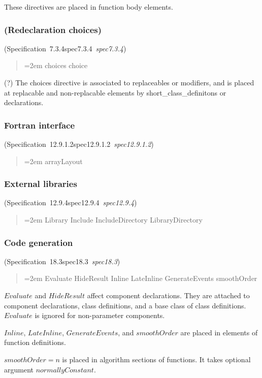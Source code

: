 \documentclass[10pt,b5paper]{article}
\def\specrefx#1#2{Specification~#1\ifx\relax#2\relax{}\else~{\it{}#2}\fi}
\def\specref#1{\specrefx{#1}{\csname spec#1\endcsname}}
\begin{document}
These directives are placed in function body elements.

\subsubsection*{(Redeclaration choices)}
(\specref{7.3.4}\/)

\begin{quote}\spaceskip=2em
choices
choice
\end{quote}

(?) The choices directive is associated to replaceables or modifiers,
and is placed at replacable and non-replacable elements by
short_class_definitons or declarations.

\subsubsection*{Fortran interface}
(\specref{12.9.1.2}\/)

\begin{quote}\spaceskip=2em
arrayLayout
\end{quote}

\subsubsection*{External libraries}
(\specref{12.9.4}\/)

\begin{quote}\spaceskip=2em
Library
Include
IncludeDirectory
LibraryDirectory
\end{quote}

\subsubsection*{Code generation}
(\specref{18.3}\/)

\begin{quote}\spaceskip=2em
Evaluate
HideResult
Inline
LateInline
GenerateEvents
smoothOrder
\end{quote}

$\mathit{Evaluate}$ and $\mathit{HideResult}$ affect component
declarations.  They are attached to component declarations, class
definitions, and a base class of class definitions.
$\mathit{Evaluate}$ is ignored for non-parameter components.

$\mathit{Inline}$, $\mathit{LateInline}$, $\mathit{GenerateEvents}$,
and $\mathit{smoothOrder}$ are placed in elements of function
definitions.

$\mathit{smoothOrder}=n$ is placed in algorithm sections of functions.
It takes optional argument $\mathit{normallyConstant}$.
\end{document}
